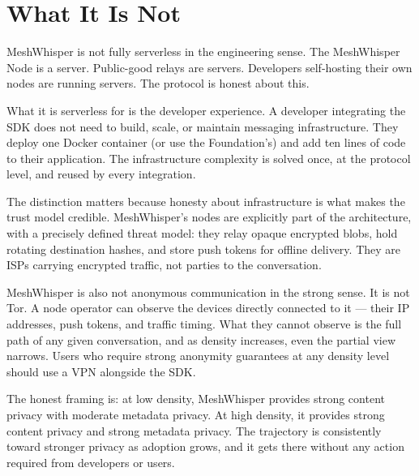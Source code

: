 \documentclass[11pt, a4paper]{article}
\begin{document}
\section{What It Is Not}

MeshWhisper is not fully serverless in the engineering sense. The MeshWhisper Node is a server. Public-good relays are servers. Developers self-hosting their own nodes are running servers. The protocol is honest about this.

What it is serverless for is the developer experience. A developer integrating the SDK does not need to build, scale, or maintain messaging infrastructure. They deploy one Docker container (or use the Foundation's) and add ten lines of code to their application. The infrastructure complexity is solved once, at the protocol level, and reused by every integration.

The distinction matters because honesty about infrastructure is what makes the trust model credible. MeshWhisper's nodes are explicitly part of the architecture, with a precisely defined threat model: they relay opaque encrypted blobs, hold rotating destination hashes, and store push tokens for offline delivery. They are ISPs carrying encrypted traffic, not parties to the conversation.

MeshWhisper is also not anonymous communication in the strong sense. It is not Tor. A node operator can observe the devices directly connected to it — their IP addresses, push tokens, and traffic timing. What they cannot observe is the full path of any given conversation, and as density increases, even the partial view narrows. Users who require strong anonymity guarantees at any density level should use a VPN alongside the SDK.

The honest framing is: at low density, MeshWhisper provides strong content privacy with moderate metadata privacy. At high density, it provides strong content privacy and strong metadata privacy. The trajectory is consistently toward stronger privacy as adoption grows, and it gets there without any action required from developers or users.
\end{document}
